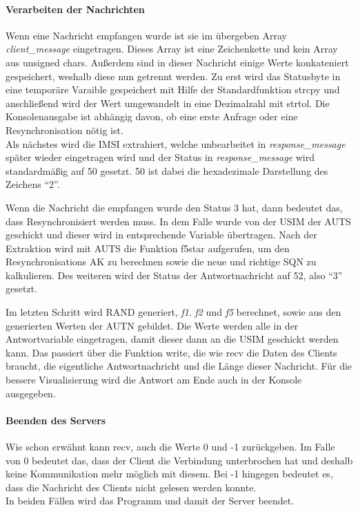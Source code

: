 		\paragraph{Verarbeiten der Nachrichten}
		Wenn eine Nachricht empfangen wurde ist sie im übergeben Array \emph{client\_message} eingetragen. Dieses
		Array ist eine Zeichenkette und kein Array aus unsigned chars. Außerdem sind in dieser Nachricht einige
		Werte konkateniert gespeichert, weshalb diese nun getrennt werden. Zu erst wird das Statusbyte in eine
		temporäre Varaible gespeichert mit Hilfe der Standardfunktion strcpy und anschließend wird der Wert
		umgewandelt in eine Dezimalzahl mit strtol. Die Konsolenausgabe ist abhängig davon, ob eine erste Anfrage
		oder eine Resynchronisation nötig ist. \\
		Als nächstes wird die IMSI extrahiert, welche unbearbeitet in \emph{response\_message} später wieder
		eingetragen wird und der Status in \emph{response\_message} wird standardmäßig auf 50 gesetzt. 50 ist
		dabei die hexadezimale Darstellung des Zeichens ``2''.
		
		Wenn die Nachricht die empfangen wurde den Status 3 hat, dann bedeutet das, dass Resynchronisiert werden
		muss. In dem Falle wurde von der USIM der AUTS geschickt und dieser wird in entsprechende Variable übertragen.
		Nach der Extraktion wird mit AUTS die Funktion f5star aufgerufen, um den Resynchronisations AK zu berechnen
		sowie die neue und richtige SQN zu kalkulieren. Des weiteren wird der Status der Antwortnachricht auf 52, also ``3''
		gesetzt.
		
		Im letzten Schritt wird RAND generiert, \emph{f1}. \emph{f2} und \emph{f5} berechnet, sowie aus den generierten
		Werten der AUTN gebildet. Die Werte werden alle in der Antwortvariable eingetragen, damit dieser dann an die USIM
		geschickt werden kann. Das passiert über die Funktion write, die wie recv die Daten des Clients braucht, die eigentliche
		Antwortnachricht und die Länge dieser Nachricht. Für die bessere Visualisierung wird die Antwort am Ende auch in
		der Konsole ausgegeben.
		
		\paragraph{Beenden des Servers}
		Wie schon erwähnt kann recv, auch die Werte 0 und -1 zurückgeben. Im Falle von 0 bedeutet das, dass der Client
		die Verbindung unterbrochen hat und deshalb keine Kommunikation mehr möglich mit diesem. Bei -1 hingegen bedeutet
		es, dass die Nachricht des Clients nicht gelesen werden konnte. \\
		In beiden Fällen wird das Programm und damit der Server beendet.

